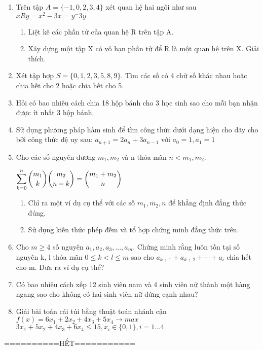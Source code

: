 \documentclass[12pt,oneside]{book}
\begin{document}
\begin{enumerate}[label = {\bf Câu \arabic*.}]
	\item Trên tập $A=\{-1,0,2,3,4\}$ xét quan hệ hai ngôi như sau $x R y = x^2-3x=y^-3y$
	\begin{enumerate}[label = \alph*)]
		\item Liệt kê các phần tử của quan hệ R trên tập A.
		\item Xây dựng một tập X có vô hạn phần tử để R là một quan hệ trên X. Giải thích.
	\end{enumerate}
	\item Xét tập hợp $S=\{0,1,2,3,5,8,9\}$. Tìm các số có 4 chữ số khác nhau hoặc chia hết cho 2 hoặc chia hết cho 5.
	\item Hỏi có bao nhiêu cách chia 18 hộp bánh cho 3 học sinh sao cho mỗi bạn nhận được ít nhất 3 hộp bánh.
	\item Sử dụng phương pháp hàm sinh để tìm công thức dưới dạng hiện cho dãy cho bởi công thức đệ uy sau: $a_{n+1}=2a_n+3a_{n-1}$ với $a_0=1,a_1=1$
	\item Cho các số nguyên dương $m_1,m_2$ và n thỏa mãn $n<m_1,m_2.$
	\begin{center}
		$\displaystyle \sum_{k=0}^n \dbinom{m_1}{k}\dbinom{m_2}{n-k}=\dbinom{m_1+m_2}{n}$
	\end{center}
	\begin{enumerate}[label = \alph*)]
		\item Chỉ ra một ví dụ cụ thể với các số $m_1,m_2,n$ để khẳng định đẳng thức đúng.
		\item Sử dụng kiến thức phép đếm và tổ hợp chứng minh đẳng thức trên.
	\end{enumerate}
	\item Cho $m \geq 4$ số nguyên $a_1,a_2,a_3,...,a_m.$ Chứng minh rằng luôn tồn tại số nguyên k, l thỏa mãn $0\leq k <l\leq m$ sao cho $a_{k+1}+a_{k+2}+\cdots+a_i$ chia hết cho m. Đưa ra ví dụ cụ thể?
	\item Có bao nhiêu cách xếp 12 sinh viên nam và 4 sinh viên nữ thành một hàng ngang sao cho không có hai sinh viên nữ đứng cạnh nhau?
	\item Giải bài toán cái túi bằng thuật toán nhánh cận\\
	$f(x) = 6x_1+2x_2+4x_3+5x_4\rightarrow max$\\
	$3x_1+5x_2+4x_3+6x_4 \leq 15, x_i \in \{ 0,1\}, i = 1...4$
\end{enumerate}
\begin{center}
	==========HẾT===========
\end{center}
\end{document}
